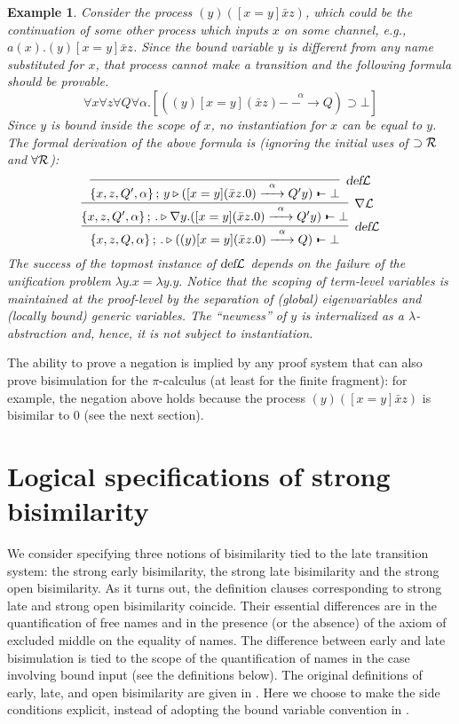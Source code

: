 \documentclass{acmtrans2m}
\newenvironment{example}{\begin{exa} \rm}{\end{exa}}
\newtheorem{exa}[theorem]{Example}
\def\relbar{\mathrel{\smash-}}
\def\joinrelm{\mathrel{\mkern-3.2mu}}
\def\tailpiece{\kern 1pt\vrule height 1ex width 0.3ex depth -.25ex}
\def\seqsym{\mathrel{\tailpiece\joinrelm\relbar}}
\newcommand{\Judg}[2]{#1\triangleright#2}
\newcommand{\NSeq}[3]{#1\,;\,#2 \seqsym #3}
\newcommand{\defL}{\hbox{\sl def}{\cal L}}
\newcommand{\forallR}{\forall{\cal R}}
\newcommand{\nablaL}{\nabla{\cal L}}
\newcommand{\oimpR}{\oimp{\cal R}}
\newcommand{\oimp}{\supset}
\newcommand{\one  }[3]{#1\stackrel{#2}{-\!\!-\!\!\!\rightarrow    } #3}
\begin{document}
\begin{example}
\label{ex:one step negative}
Consider the process $(y)([x=y]\bar{x}z)$, which could be the
continuation of some other process which inputs $x$ on some channel,
{\em e.g.}, $a(x).(y)[x = y] \bar{x} z$.  
Since the bound variable $y$ is different from
any name substituted for $x$, that process cannot make
a transition and the following formula should be provable.
$$
\forall x\forall z\forall Q \forall \alpha.[(\one{(y)[x = y]
    (\bar{x}z )}{\alpha}{Q}) \oimp \bot]
$$ 
Since $y$ is bound inside the
scope of $x$,  no instantiation for $x$ can be equal to $y$.
The formal derivation of the above formula is (ignoring the initial 
uses of $\oimpR$ and $\forallR$):
$$
\infer[\defL]
{\NSeq{\{x,z,Q,\alpha \}}{\Judg{.}{(\one{(y)[x = y] (\bar{x}z.0)}{\alpha}{Q})}}{\bot}}
{
\infer[\nablaL]
{\NSeq{\{x,z,Q',\alpha \}}{\Judg{.}{\nabla y.(\one{[x = y] (\bar{x}z.0)}{\alpha}{Q' y})}}{\bot}}
{
\infer[\defL]
{\NSeq{\{x,z,Q',\alpha \}}{\Judg{y}{(\one{[x = y](\bar{x}z.0)}{\alpha}{Q' y})}}{\bot}}
{}
}
}
$$
The success of the topmost instance of $\defL$ depends on the failure of 
the unification problem
$
\lambda y.x = \lambda y.y.
$
Notice that the scoping of term-level variables is maintained at the proof-level
by the separation of (global) eigenvariables and (locally bound) generic variables.
The ``newness'' of $y$ is internalized as a $\lambda$-abstraction and, hence,
it is not subject to instantiation. 
\end{example}

The ability to prove a negation is implied by any proof system that
can also prove bisimulation for the $\pi$-calculus (at least for
the finite fragment): for
example, the negation above holds because the process
$(y)([x=y]\bar{x}z)$ is bisimilar to $0$ (see the next
section). 


\section{Logical specifications of strong bisimilarity}
\label{sec:bisim}

We consider specifying three notions of bisimilarity tied to the late
transition system: the strong early bisimilarity, the strong late bisimilarity 
and the strong open bisimilarity.  As it turns out, the definition clauses
corresponding to strong late and strong open bisimilarity coincide.
Their essential differences are in the quantification of free names
and in the presence (or the absence) of the axiom of excluded middle
on the equality of names.
The difference between early and late bisimulation is tied to the scope
of the quantification of names in the case involving bound input (see the
definitions below).
The original definitions of early, late, and open bisimilarity are given in 
\cite{milner92icII,sangiorgi01}.  Here we choose to make the
side conditions explicit, instead of adopting the bound variable
convention in \cite{sangiorgi01}.
\end{document}
